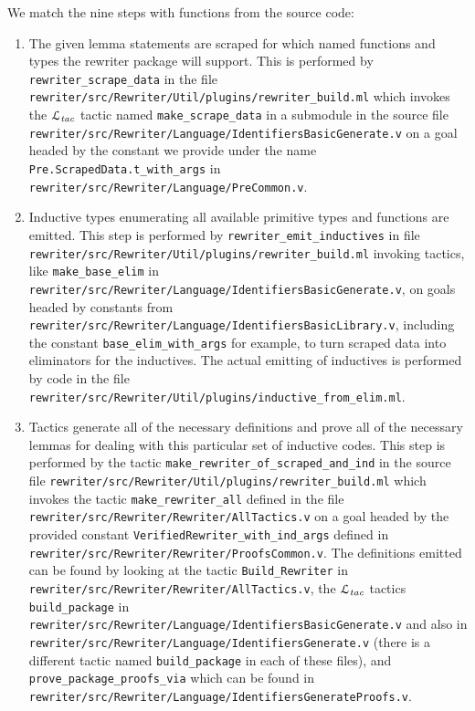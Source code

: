 \documentclass[a4paper,USenglish,cleveref,autoref,thm-restate]{lipics-v2021}
\newcommand{\Ltac}{\ensuremath{\mathcal{L}_\text{\emph{tac}}}}
\begin{document}
We match the nine steps with functions from the source code:
\begin{enumerate}
  \item
    The given lemma statements are scraped for which named functions and types the rewriter package will support.
    This is performed by \texttt{rewriter\_scrape\_data} in the file \texttt{rewriter/src/Rewriter/Util/plugins/rewriter\_build.ml} which invokes the \Ltac{} tactic named \texttt{make\_scrape\_data} in a submodule in the source file \texttt{rewriter/src/Rewriter/Language/IdentifiersBasicGenerate.v} on a goal headed by the constant we provide under the name \texttt{Pre.ScrapedData.t\_with\_args} in \texttt{rewriter/src/Rewriter/Language/PreCommon.v}.
  \item
    Inductive types enumerating all available primitive types and functions are emitted.
    This step is performed by \texttt{rewriter\_emit\_inductives} in file \texttt{rewriter/src/Rewriter/Util/plugins/rewriter\_build.ml} invoking tactics, like \texttt{make\_base\_elim} in \texttt{rewriter/src/Rewriter/Language/IdentifiersBasicGenerate.v}, on goals headed by constants from \texttt{rewriter/src/Rewriter/Language/IdentifiersBasicLibrary.v}, including the constant \texttt{base\_elim\_with\_args} for example, to turn scraped data into eliminators for the inductives.
    The actual emitting of inductives is performed by code in the file \texttt{rewriter/src/Rewriter/Util/plugins/inductive\_from\_elim.ml}.
  \item
    Tactics generate all of the necessary definitions and prove all of the necessary lemmas for dealing with this particular set of inductive codes.
    This step is performed by the tactic \texttt{make\_rewriter\_of\_scraped\_and\_ind} in the source file \texttt{rewriter/src/Rewriter/Util/plugins/rewriter\_build.ml} which invokes the tactic \texttt{make\_rewriter\_all} defined in the file \texttt{rewriter/src/Rewriter/Rewriter/AllTactics.v} on a goal headed by the provided constant \texttt{VerifiedRewriter\_with\_ind\_args} defined in \texttt{rewriter/src/Rewriter/Rewriter/ProofsCommon.v}.
    The definitions emitted can be found by looking at the tactic \texttt{Build\_Rewriter} in \texttt{rewriter/src/Rewriter/Rewriter/AllTactics.v}, the \Ltac{} tactics \texttt{build\_package} in \texttt{rewriter/src/Rewriter/Language/IdentifiersBasicGenerate.v} and also in \texttt{rewriter/src/Rewriter/Language/IdentifiersGenerate.v} (there is a different tactic named \texttt{build\_package} in each of these files), and \texttt{prove\_package\_proofs\_via} which can be found in \texttt{rewriter/src/Rewriter/Language/IdentifiersGenerateProofs.v}.

\end{enumerate}
\end{document}
